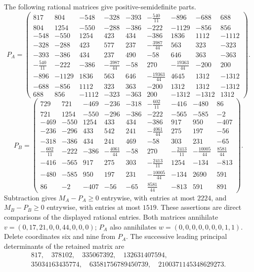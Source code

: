 The following rational matrices give positive-semidefinite parts.
\begingroup\setlength\arraycolsep{2pt}\scriptsize
\[
P_A=\begin{pmatrix}
817&804&-548&-328&-393&-\frac{540}{11}&-896&-688&688\\
804&1254&-550&-288&-386&-222&-1129&-856&856\\
-548&-550&1254&423&434&-386&1836&1112&-1112\\
-328&-288&423&577&237&-\frac{3987}{44}&563&323&-323\\
-393&-386&434&237&490&-58&646&363&-363\\
-\frac{540}{11}&-222&-386&-\frac{3987}{44}&-58&270&-\frac{19363}{44}&-200&200\\
-896&-1129&1836&563&646&-\frac{19363}{44}&4645&1312&-1312\\
-688&-856&1112&323&363&-200&1312&1312&-1312\\
688&856&-1112&-323&-363&200&-1312&-1312&1312
\end{pmatrix}.
\]
\[
P_B=\begin{pmatrix}
729&721&-469&-236&-318&-\frac{602}{11}&-416&-480&86\\
721&1254&-550&-296&-386&-222&-565&-585&-2\\
-469&-550&1254&433&434&-386&917&950&-407\\
-236&-296&433&542&241&-\frac{4061}{44}&275&197&-56\\
-318&-386&434&241&469&-58&303&231&-65\\
-\frac{602}{11}&-222&-386&-\frac{4061}{44}&-58&270&-\frac{2413}{11}&-\frac{10005}{44}&\frac{8581}{44}\\
-416&-565&917&275&303&-\frac{2413}{11}&1254&-134&-813\\
-480&-585&950&197&231&-\frac{10005}{44}&-134&2690&591\\
86&-2&-407&-56&-65&\frac{8581}{44}&-813&591&891
\end{pmatrix}.
\]
\endgroup
Subtraction gives $M_A-P_A\geq0$ entrywise, with entries at most
$2224$, and $M_B-P_B\geq0$ entrywise, with entries at most $1519$.
These assertions are direct comparisons of the displayed rational
entries. Both matrices annihilate
$v=(0,17,21,0,0,44,0,0,0)$; $P_A$ also annihilates
$w=(0,0,0,0,0,0,0,1,1)$.
Delete coordinates six and nine from $P_A$. The successive leading
principal determinants of the retained matrix are
\[
\begin{gathered}
817,\quad378102,\quad335067392,\quad132631407594,\\
35034163435774,\quad63581756789450739,\quad2100371145348629273.
\end{gathered}
\]
